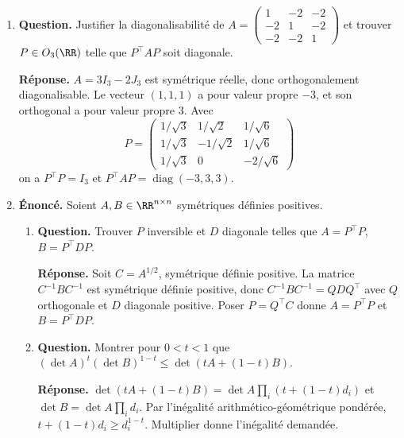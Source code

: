 \documentclass[12pt, a4paper]{article}
\begin{document}
\begin{enumerate}[label=9.\arabic*., start=94]
  \item \begin{minipage}[t]{\linewidth}\raggedright
\textbf{Question.} Justifier la diagonalisabilité de $A=\begin{pmatrix}1&-2&-2\\-2&1&-2\\-2&-2&1\end{pmatrix}$ et trouver $P\in O_3(\RR)$ telle que $P^\top AP$ soit diagonale.
\par\smallskip
\textbf{Réponse.} $A=3I_3-2J_3$ est symétrique réelle, donc orthogonalement diagonalisable.
    Le vecteur $(1,1,1)$ a pour valeur propre $-3$, et son orthogonal a pour valeur propre $3$.
    Avec
    \[
      P=\begin{pmatrix}1/\sqrt3&1/\sqrt2&1/\sqrt6\\1/\sqrt3&-1/\sqrt2&1/\sqrt6\\1/\sqrt3&0&-2/\sqrt6\end{pmatrix}
    \]
    on a $P^\top P=I_3$ et $P^\top AP=\operatorname{diag}(-3,3,3)$.
\end{minipage}

  \item \begin{minipage}[t]{\linewidth}\raggedright
\textbf{Énoncé.} Soient $A,B\in\RR^{n\times n}$ symétriques définies positives.

\begin{enumerate}[\arabic*.]
        \item \textbf{Question.} Trouver $P$ inversible et $D$ diagonale telles que $A=P^\top P$, $B=P^\top DP$.
\par\smallskip
\textbf{Réponse.} Soit $C=A^{1/2}$, symétrique définie positive.
        La matrice $C^{-1}BC^{-1}$ est symétrique définie positive, donc $C^{-1}BC^{-1}=QDQ^\top$ avec $Q$ orthogonale et $D$ diagonale positive.
        Poser $P=Q^\top C$ donne $A=P^\top P$ et $B=P^\top DP$.

  \item \textbf{Question.} Montrer pour $0<t<1$ que $(\det A)^t(\det B)^{1-t}\leq\det(tA+(1-t)B)$.
\par\smallskip
\textbf{Réponse.} $\det(tA+(1-t)B)=\det A\prod_i(t+(1-t)d_i)$ et $\det B=\det A\prod_i d_i$.
        Par l'inégalité arithmético-géométrique pondérée, $t+(1-t)d_i\geq d_i^{1-t}$.
        Multiplier donne l'inégalité demandée.

\end{enumerate}
\end{minipage}


\end{enumerate}
\end{document}
